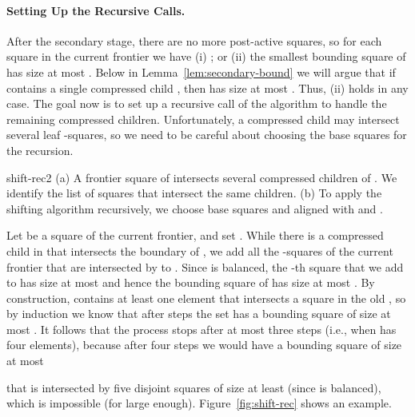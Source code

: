 \documentclass[11pt]{paper}
\begin{document}
      \paragraph{Setting Up the Recursive Calls.}
      After the secondary stage, there are no more post-active squares, so 
      for each square  in the current frontier
      we have (i) ; or (ii) the smallest bounding
      square of  has size at most .
      Below in Lemma~\ref{lem:secondary-bound} 
      we will argue that if  contains a single
      compressed child , then  has size at most
      . Thus, (ii) holds in any case. 
      The goal now is to set up a recursive call of the algorithm to handle
      the remaining compressed children. Unfortunately, a compressed
      child may intersect several leaf -squares,
      so we need to be careful about choosing the base squares for the
      recursion. 

       {shift-rec2}
      { (a) A frontier square  of  intersects several compressed children of . We identify the list  of  squares that intersect the same children.
        (b) To apply the shifting algorithm recursively, we choose base squares  and  aligned with  and .
      }
      
      Let  be a square of the current frontier, and set .
      While there is a compressed child  in 
       that intersects 
      the boundary of 
      , we add all the -squares 
      of the current frontier
      that are intersected by  to .  Since  is balanced, the 
      -th square  that we add to  has size at most  and
      hence the bounding square of   has size at most 
      . By construction,  contains at least
      one element that intersects a square in the old , so by induction
      we know that after  steps the set
       has a bounding square of size at most
      . It follows that the process stops after at most
      three steps (i.e., when  has four elements), because after
      four steps we would have a bounding square of size at most 
      
      that is intersected by five disjoint squares of size at least 
       (since 
       is balanced), which is impossible (for  large enough).
      Figure~\ref {fig:shift-rec} shows an example.
\end{document}
